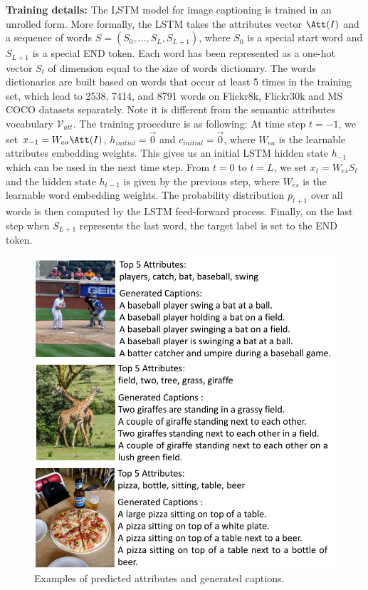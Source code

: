 \vspace{3pt}
\noindent \textbf{Training details:} The LSTM model for image captioning is trained in an unrolled form. More formally, the LSTM takes the attributes vector $\Att(I)$ and a sequence of words $S=(S_0,...,S_L,S_{L+1})$, where $S_0$ is a special start word and $S_{L+1}$ is a special END token. Each word has been represented as a one-hot vector $S_t$ of dimension equal to the size of words dictionary. The words dictionaries are built based on words that occur at least 5 times in the training set, which lead to 2538, 7414, and 8791 words on Flickr8k, Flickr30k and MS COCO datasets separately. Note it is different from the semantic attributes vocabulary $\mathcal{V}_{att}$. The training procedure is as following: At time step $t=-1$, we set $x_{-1}=W_{ea}\Att(I)$, $h_{initial}=\vec{0}$ and $c_{initial}=\vec{0}$, where $W_{ea}$ is the learnable attributes embedding weights. This gives us an initial LSTM hidden state $h_{-1}$ which can be used in the next time step. From $t=0$ to $t=L$, we set $x_t=W_{es}S_t$ and the hidden state $h_{t-1}$ is given by the previous step, where $W_{es}$ is the learnable word embedding weights. The probability distribution $p_{t+1}$ over all words is then computed by the LSTM feed-forward process. Finally, on the last step when $S_{L+1}$ represents the last word, the target label is set to the END token.

\begin{figure}[t]
\begin{center}
   \includegraphics[width=0.95\linewidth]{img/samples_3.pdf}
\end{center}
\vspace{-10pt}
   \caption{Examples of predicted attributes and generated captions.}
   \vspace{-7pt}
   \label{att_caP_examples}
\end{figure}

